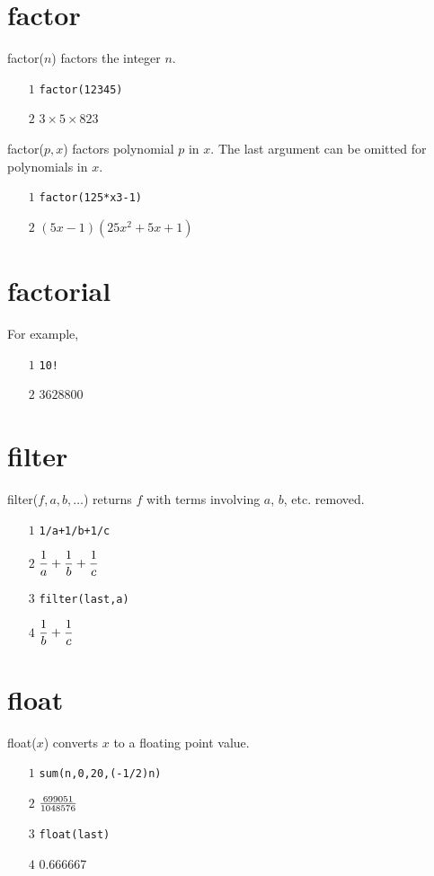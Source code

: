 \documentclass[12pt,openany]{report}
\begin{document}
\section*{factor}
factor($n$) factors the integer $n$.
\begin{itemize}
\item[$\scriptstyle1$]{\tt factor(12345)}
\item[$\scriptstyle2$]\hspace{50pt} $3\times 5\times 823$
\end{itemize}
%
factor($p,x$) factors polynomial $p$ in $x$.
The last argument can be omitted for polynomials in $x$.
\begin{itemize}
\item[$\scriptstyle1$]{\tt factor(125*x{}3-1)}
\item[$\scriptstyle2$]\hspace{50pt} $(5x-1)(25x^2+5x+1)$
\end{itemize}

\section*{factorial}
For example,
\begin{itemize}
\item[$\scriptstyle1$]{\tt 10!}
\item[$\scriptstyle2$]\hspace{50pt} $3628800$
\end{itemize}

\section*{filter}
filter($f,a,b,\ldots$) returns $f$ with terms involving $a$, $b$, etc. removed.
\begin{itemize}
\item[$\scriptstyle1$]{\tt 1/a+1/b+1/c}
\item[$\scriptstyle2$]\hspace{50pt} $\displaystyle{{1\over a}+{1\over b}+{1\over c}}$
\item[$\scriptstyle3$]{\tt filter(last,a)}
\item[$\scriptstyle4$]\hspace{50pt} $\displaystyle{{1\over b}+{1\over c}}$
\end{itemize}

\section*{float}
float($x$) converts $x$ to a floating point value.
\begin{itemize}
\item[$\scriptstyle1$]{\tt sum(n,0,20,(-1/2){}n)}
\item[$\scriptstyle2$]\hspace{50pt} $699051\over1048576$
\item[$\scriptstyle3$]{\tt float(last)}
\item[$\scriptstyle4$]\hspace{50pt} 0.666667
\end{itemize}
\end{document}
